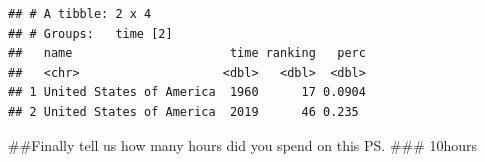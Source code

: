 \documentclass[
]{article}
\begin{document}
\begin{verbatim}
## # A tibble: 2 x 4
## # Groups:   time [2]
##   name                      time ranking   perc
##   <chr>                    <dbl>   <dbl>  <dbl>
## 1 United States of America  1960      17 0.0904
## 2 United States of America  2019      46 0.235
\end{verbatim}

\#\#Finally tell us how many hours did you spend on this PS. \#\#\#
10hours
\end{document}
